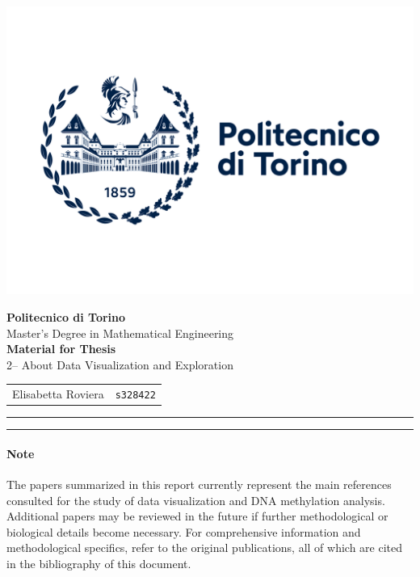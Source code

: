 \documentclass[10pt]{extarticle}
\begin{document}
\noindent
\begin{minipage}{0.3\textwidth}
    \includegraphics[width=1.3\linewidth]{Figures/polito_logo_2021_blu.jpg}
\end{minipage}
\hfill
\begin{minipage}{0.68\textwidth}
    \raggedleft
    {\LARGE \textbf{Politecnico di Torino}}\\[0.2cm]
    {\large Master's Degree in Mathematical Engineering}\\[0.7cm]
    {\large \textbf{Material for Thesis}}\\[0.2cm]
    {\large 2-- About Data Visualization and Exploration}\\[0.7cm]
    \begin{tabular}{rl}
        Elisabetta Roviera & \texttt{s328422} \\
    \end{tabular}
\end{minipage}

\vspace{1cm}
\hrule
\vspace{0.5cm}

\tableofcontents

\vspace{0.5cm}
\hrule
\vspace{1cm}


\justifying

\paragraph{Note} The papers summarized in this report currently represent the main references consulted for the study of data visualization and DNA methylation analysis. Additional papers may be reviewed in the future if further methodological or biological details become necessary. For comprehensive information and methodological specifics, refer to the original publications, all of which are cited in the bibliography of this document.
\end{document}
